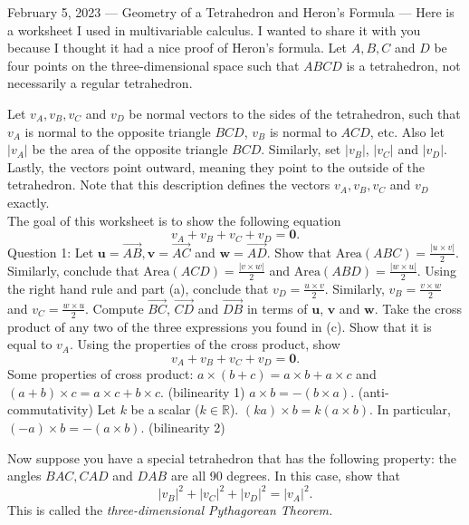 February 5, 2023
---
Geometry of a Tetrahedron and Heron's Formula
---
Here is a worksheet I used in multivariable calculus. I wanted to share it with you because I thought it had a nice proof of Heron's formula.
Let $A,B,C$ and $D$ be four points on the three-dimensional space such that $ABCD$ is a tetrahedron, not necessarily a regular tetrahedron.

Let  $v_A, v_B, v_C$ and $v_D$ be normal vectors to the sides of the tetrahedron, such that $v_A$ is normal to the opposite triangle $BCD$, $v_B$ is normal to $ACD$, etc. Also let $|v_A|$ be the area of the opposite triangle $BCD$. Similarly, set $|v_B|$, $|v_C|$ and $|v_D|$. Lastly, the vectors point outward, meaning they point to the outside of the tetrahedron. Note that this description defines the vectors $v_A, v_B, v_C$ and $v_D$ exactly.\\

The goal of this worksheet is to show the following equation $$v_A+v_B+v_C+v_D = \textbf{0}.$$ Question 1: Let $\textbf{u} = \overset{\rightarrow}{AB}, \textbf{v} = \overset{\rightarrow}{AC}$ and $\textbf{w} = \overset{\rightarrow}{AD}.$ Show that $\textrm{Area}(ABC) = \frac{|u\times v|}{2}$. Similarly, conclude that $\textrm{Area}(ACD) = \frac{|v\times w|}{2}$ and $\textrm{Area}(ABD) = \frac{|w\times u|}{2}$. Using the right hand rule and part (a), conclude that $v_D = \frac{u\times v}{2}$. Similarly, $v_B = \frac{v\times w}{2}$ and $v_C = \frac{w\times u}{2}$. Compute $\overset{\rightarrow}{BC}$, $\overset{\rightarrow}{CD}$ and $\overset{\rightarrow}{DB}$ in terms of $\textbf{u}$, $\textbf{v}$ and $\textbf{w}$. Take the cross product of any two of the three expressions you found in (c). Show that it is equal to $v_A.$
Using the properties of the cross product, show $$v_A + v_B + v_C + v_D = \textbf{0}.$$ Some properties of cross product:
$a\times (b+c) = a\times b + a\times c$ and $(a+b) \times c = a\times c + b\times c.$ (bilinearity 1) 
$a\times b = - (b\times a).$ (anti-commutativity)
Let $k$ be a scalar ($k\in \mathbb{R}$). $(ka) \times b = k(a\times b).$ In particular, $(-a)\times b = -(a\times b).$ (bilinearity 2)


Now suppose you have a special tetrahedron that has the following property: the angles $BAC, CAD$ and $DAB$ are all 90 degrees. In this case, show that $$|v_B|^2+|v_C|^2+|v_D|^2 = |v_A|^2.$$ This is called the \textit{three-dimensional Pythagorean Theorem.}